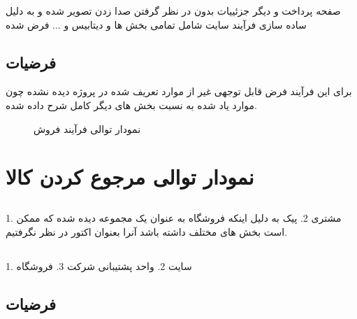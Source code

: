 \documentclass[12pt,onecolumn,a4paper]{article}
\begin{document}
صفحه پرداخت و دیگر جزئییات بدون در نظر گرفتن صدا زدن  تصویر شده و به دلیل ساده سازی فرآیند سایت شامل تمامی بخش ها و دیتابیس و ... فرض شده

\subsection{فرضیات }
برای این فرآیند فرض قابل توجهی غیر از موارد تعریف شده در پروژه دیده نشده چون موارد یاد شده به نسبت بخش های دیگر کامل شرح داده شده.

\newpage
\begin{figure}[!h]
\caption{نمودار توالی فرآیند فروش}\label{sel1lpng}
\end{figure}


\section{نمودار توالی مرجوع کردن کالا}
\subsection{ }
1. مشتری
2. پیک
به دلیل اینکه فروشگاه به عنوان یک مجموعه دیده شده که ممکن است بخش های مختلف داشته باشد آنرا بعنوان اکتور در نظر نگرفتیم.

\subsection{ }
1. سایت
2. واحد پشتیبانی شرکت
3. فروشگاه
\subsection{فرضیات }
\end{document}
